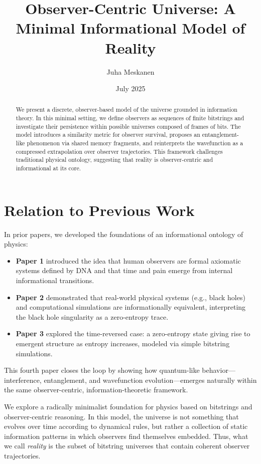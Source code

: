 \documentclass[12pt]{article}
\title{Observer-Centric Universe: A Minimal Informational Model of Reality}
\author{Juha Meskanen}
\date{July 2025}
\begin{document}
\maketitle

\begin{abstract}
      We present a discrete, observer-based model of the universe grounded in information theory.
      In this minimal setting, we define observers as sequences of finite bitstrings and investigate their persistence within possible universes composed of frames of bits.
      The model introduces a similarity metric for observer survival, proposes an entanglement-like phenomenon via shared memory fragments, and reinterprets the wavefunction as a compressed extrapolation over observer trajectories. This framework challenges traditional physical ontology, suggesting that reality is observer-centric and informational at its core.
\end{abstract}


\section*{Relation to Previous Work}

In prior papers, we developed the foundations of an informational ontology of physics:

\begin{itemize}
      \item \textbf{Paper 1} introduced the idea that human observers are formal axiomatic systems defined by DNA and that time and pain emerge from internal informational transitions.
      \item \textbf{Paper 2} demonstrated that real-world physical systems (e.g., black holes) and computational simulations are informationally equivalent, interpreting the black hole singularity as a zero-entropy trace.
      \item \textbf{Paper 3} explored the time-reversed case: a zero-entropy state giving rise to emergent structure as entropy increases, modeled via simple bitstring simulations.
\end{itemize}

This fourth paper closes the loop by showing how quantum-like behavior—interference, entanglement, and wavefunction evolution—emerges naturally within the same observer-centric, information-theoretic framework.

We explore a radically minimalist foundation for physics based on bitstrings and observer-centric reasoning. In this model, the universe is not something that evolves over time according to dynamical rules, but rather a collection of static information patterns in which observers find themselves embedded. Thus, what we call \emph{reality} is the subset of bitstring universes that contain coherent observer trajectories.
\end{document}
